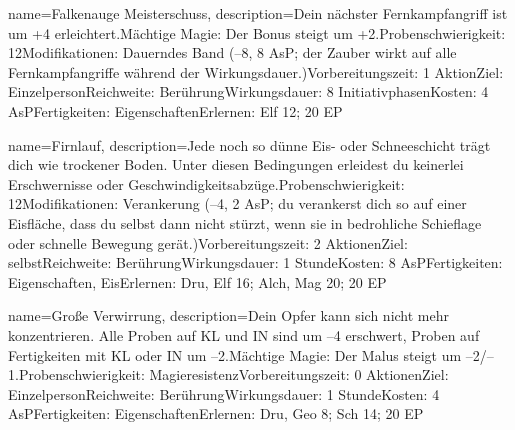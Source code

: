 {
    name={Falkenauge Meisterschuss},
    description={Dein nächster Fernkampfangriff ist um +4 erleichtert.\newline Mächtige Magie: Der Bonus steigt um +2.\newline Probenschwierigkeit: 12\newline Modifikationen: Dauerndes Band (–8, 8 AsP; der Zauber wirkt auf alle Fernkampfangriffe während der Wirkungsdauer.)\newline Vorbereitungszeit: 1 Aktion\newline Ziel: Einzelperson\newline Reichweite: Berührung\newline Wirkungsdauer: 8 Initiativphasen\newline Kosten: 4 AsP\newline Fertigkeiten: Eigenschaften\newline Erlernen: Elf 12; 20 EP}
}


{
    name={Firnlauf},
    description={Jede noch so dünne Eis- oder Schneeschicht trägt dich wie trockener Boden. Unter diesen Bedingungen erleidest du keinerlei Erschwernisse oder Geschwindigkeitsabzüge.\newline Probenschwierigkeit: 12\newline Modifikationen: Verankerung (–4, 2 AsP; du verankerst dich so auf einer Eisfläche, dass du selbst dann nicht stürzt, wenn sie in bedrohliche Schieflage oder schnelle Bewegung gerät.)\newline Vorbereitungszeit: 2 Aktionen\newline Ziel: selbst\newline Reichweite: Berührung\newline Wirkungsdauer: 1 Stunde\newline Kosten: 8 AsP\newline Fertigkeiten: Eigenschaften, Eis\newline Erlernen: Dru, Elf 16; Alch, Mag 20; 20 EP}
}


{
    name={Große Verwirrung},
    description={Dein Opfer kann sich nicht mehr konzentrieren. Alle Proben auf KL und IN sind um –4 erschwert, Proben auf Fertigkeiten mit KL oder IN um –2.\newline Mächtige Magie: Der Malus steigt um –2/–1.\newline Probenschwierigkeit: Magieresistenz\newline Vorbereitungszeit: 0 Aktionen\newline Ziel: Einzelperson\newline Reichweite: Berührung\newline Wirkungsdauer: 1 Stunde\newline Kosten: 4 AsP\newline Fertigkeiten: Eigenschaften\newline Erlernen: Dru, Geo 8; Sch 14; 20 EP}
}


